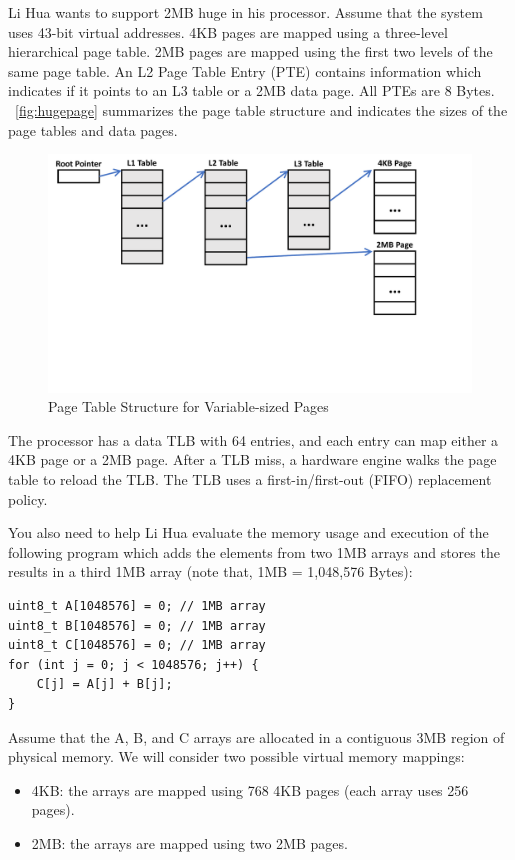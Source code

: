 \documentclass[addpoints, 12pt, answers]{exam}
\begin{document}
\begin{questions}
Li Hua wants to support 2MB huge in his processor. 
Assume that the system uses 43-bit virtual addresses. 
4KB pages are mapped using a three-level hierarchical page table. 
2MB pages are mapped using the first two levels of the same page table. 
An L2 Page Table Entry (PTE) contains information which indicates 
if it points to an L3 table or a 2MB data page. 
All PTEs are 8 Bytes. 
~\autoref{fig:hugepage} summarizes the page table structure and indicates the
sizes of the page tables and data pages.

\begin{figure}[h]
	\centering
	\includegraphics[width=0.8\columnwidth]{fig/hugepage.pdf}
	\caption{Page Table Structure for Variable-sized Pages}\label{fig:hugepage}
\end{figure}

The processor has a data TLB with 64 entries, and each entry can map either a 4KB page or a 2MB page. 
After a TLB miss, a hardware engine walks the page table to reload the TLB. 
The TLB uses a first-in/first-out (FIFO) replacement policy.

You also need to help Li Hua evaluate the memory usage and execution of the following program 
which adds the elements from two 1MB arrays and stores the results in a third 1MB array 
(note that, 1MB = 1,048,576 Bytes):

\begin{lstlisting}
uint8_t A[1048576] = 0; // 1MB array
uint8_t B[1048576] = 0; // 1MB array
uint8_t C[1048576] = 0; // 1MB array
for (int j = 0; j < 1048576; j++) {
	C[j] = A[j] + B[j];
}
\end{lstlisting}

Assume that the A, B, and C arrays are allocated in a contiguous 3MB region of physical memory.
We will consider two possible virtual memory mappings:
\begin{itemize}
	\item 4KB: the arrays are mapped using 768 4KB pages (each array uses 256 pages).
	\item 2MB: the arrays are mapped using two 2MB pages.
\end{itemize}


\end{questions}
\end{document}
